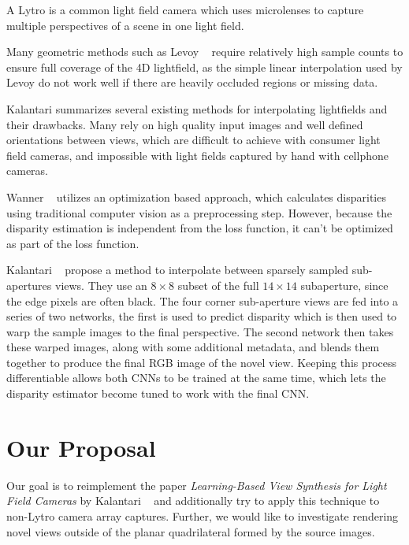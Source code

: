 \documentclass[10pt,twocolumn,letterpaper]{article}
\begin{document}
A Lytro is a common light field camera which uses microlenses to capture multiple
perspectives of a scene in one light field. 

Many geometric methods such as Levoy \etal~\cite{levoy1996light} require relatively high sample counts to ensure full
coverage of the 4D lightfield, as the simple linear interpolation used by Levoy
do not work well if there are heavily occluded regions or missing data.

Kalantari summarizes several existing methods for interpolating lightfields and their drawbacks.
Many rely on high quality input images and well defined orientations between views,
which are difficult to achieve with consumer light field cameras, and impossible with light fields
captured by hand with cellphone cameras.

Wanner \etal~\cite{Wanner} utilizes an optimization based approach, which calculates disparities
using traditional computer vision as a preprocessing step. However, because the disparity estimation
is independent from the loss function, it can't be optimized as part of the loss function. 

Kalantari \etal~\cite{LearningViewSynthesis} propose a method to interpolate between 
sparsely sampled sub-apertures views. They use an $8 \times 8$ subset of the full $14 \times 14$ subaperture, since the
edge pixels are often black. The four corner sub-aperture views are fed into a series of two 
networks, the first is used to predict disparity which is then used to warp the sample images to the final perspective.
The second network then takes these warped images, along with some additional metadata, and blends them together
to produce the final RGB image of the novel view. Keeping this process differentiable allows both CNNs to 
be trained at the same time, which lets the disparity estimator become tuned to work with the final CNN.

\section{Our Proposal}

Our goal is to reimplement the paper \textit{Learning-Based View Synthesis for Light Field Cameras} by 
Kalantari \etal~\cite{LearningViewSynthesis} and additionally try to apply this technique to non-Lytro camera
array captures. Further, we would like to investigate rendering novel views outside of the planar
quadrilateral formed by the source images.
\end{document}
